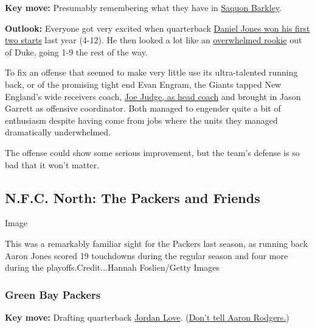 \textbf{Key move:} Presumably remembering what they have in
\href{https://www.nytimes3xbfgragh.onion/2019/10/18/sports/football/saquon-barkley-return-giants.html}{Saquon
Barkley}.

\textbf{Outlook:} Everyone got very excited when quarterback
\href{https://www.nytimes3xbfgragh.onion/2019/09/29/sports/football/daniel-jones-giants-draft-haskins.html}{Daniel
Jones won his first two starts} last year (4-12). He then looked a lot
like an
\href{https://www.nytimes3xbfgragh.onion/2019/08/07/sports/football/daniel-jones-eli-manning-giants-quarterback.html}{overwhelmed
rookie} out of Duke, going 1-9 the rest of the way.

To fix an offense that seemed to make very little use its ultra-talented
running back, or of the promising tight end Evan Engram, the Giants
tapped New England's wide receivers coach,
\href{https://www.nytimes3xbfgragh.onion/2020/01/07/sports/football/joe-judge-giants.html}{Joe
Judge, as head coach} and brought in Jason Garrett as offensive
coordinator. Both managed to engender quite a bit of enthusiasm despite
having come from jobs where the units they managed dramatically
underwhelmed.

The offense could show some serious improvement, but the team's defense
is so bad that it won't matter.

\hypertarget{nfc-north-the-packers-and-friends}{%
\subsection{N.F.C. North: The Packers and
Friends}\label{nfc-north-the-packers-and-friends}}

Image

This was a remarkably familiar sight for the Packers last season, as
running back Aaron Jones scored 19 touchdowns during the regular season
and four more during the playoffs.Credit...Hannah Foslien/Getty Images

\hypertarget{green-bay-packers}{%
\subsubsection{\texorpdfstring{\textbf{Green Bay
Packers}}{Green Bay Packers}}\label{green-bay-packers}}

\textbf{Key move:} Drafting quarterback
\href{https://www.nytimes3xbfgragh.onion/article/jordan-love.html}{Jordan
Love}.
(\href{https://www.nytimes3xbfgragh.onion/2020/08/31/sports/football/nfl-quarterback-controversies.html}{Don't
tell Aaron Rodgers.})

